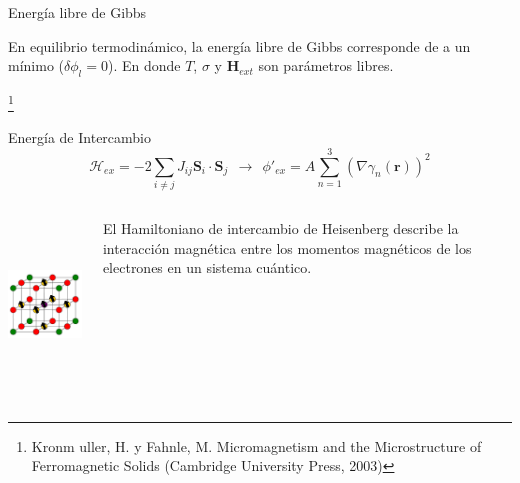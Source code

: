 \documentclass{beamer}
\newcommand\blfootnote[1]{%
  \begingroup
  \renewcommand\thefootnote{}\footnote{#1}%
  \addtocounter{footnote}{-1}%
  \endgroup
}
\begin{document}
\begin{frame}{Energía libre de Gibbs}
    \vspace{0.3cm}

    \small
    En equilibrio termodinámico, la energía libre de Gibbs corresponde de a un mínimo ($\delta \phi_l = 0$). En donde $T$, $\sigma$ y $\bm{H}_{ext}$ son parámetros libres.

    \blfootnote{{\tiny Kronm uller, H. y Fahnle, M. Micromagnetism and the Microstructure of Ferromagnetic Solids (Cambridge University Press, 2003)}}
\end{frame}



\begin{frame}{Energía de Intercambio}
    \[ \mathcal{H}_{ex} = - 2 \sum_{i \neq j} J_{ij} \bm{S}_i \cdot \bm{S}_j ~~ \rightarrow ~~ \phi'_{ex} = A \sum_{n=1}^3 (\nabla \gamma_n (\bm{r}) )^2\]
    \begin{columns}
        \begin{column}{0.5\textwidth}
            \centering
            \includegraphics[width=4.5cm,height=4.5cm]{pic/CS.png}
        \end{column}
        \begin{column}{0.5\textwidth}
            El Hamiltoniano de intercambio de Heisenberg describe la interacción magnética entre los momentos magnéticos de los electrones en un sistema cuántico.
        \end{column}
    \end{columns}
\end{frame}
\end{document}
